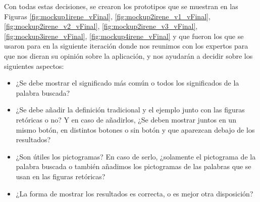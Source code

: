 Con todas estas decisiones, se crearon los prototipos que se muestran en las Figuras \ref{fig:mockup1irene_vFinal}, \ref{fig:mockup2irene_v1_vFinal}, \ref{fig:mockup2irene_v2_vFinal}, \ref{fig:mockup2irene_v3_vFinal}, \ref{fig:mockup3irene_vFinal}, \ref{fig:mockup4irene_vFinal} y que fueron los que se usaron para en la siguiente iteración donde nos reunimos con los expertos para que nos dieran su opinión sobre la aplicación, y nos ayudarán a decidir sobre los siguientes aspectos:
\begin{itemize}
	\item ¿Se debe mostrar el significado más común o todos los significados de la palabra buscada?
	\item ¿Se debe añadir la definición tradicional y el ejemplo junto con las figuras retóricas o no?  Y en caso de añadirlos, ¿Se deben mostrar juntos en un mismo botón, en distintos botones o sin botón y que aparezcan debajo de los resultados?
	\item ¿Son útiles los pictogramas? En caso de serlo, ¿solamente el pictograma de la palabra buscada o también añadimos los pictogramas de las palabras que se usan en las figuras retóricas?
	\item ¿La forma de mostrar los resultados es correcta, o es mejor otra disposición?
	
\end{itemize} 


 	
	
